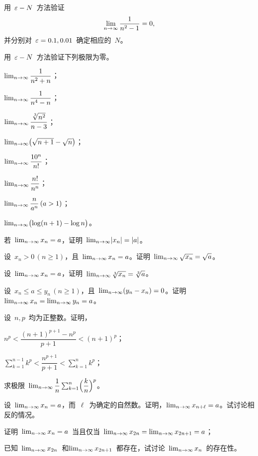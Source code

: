 \begin{exercise}
\item 用~$\e-N$~方法验证
\[
  \lim_\ntoinf\frac1{n^2-1}=0,
\]
并分别对~$\e=0.1,0.01$~确定相应的~$N$。
\item 用~$\e-N$~方法验证下列极限为零。
\begin{exlistcols}[3]
\item $\lim_\ntoinf\dfrac1{n^2+n}$；
\item $\lim_\ntoinf\dfrac1{n^4-n}$；
\item $\lim_\ntoinf\dfrac{\sqrt[3]{n^2}}{n-3}$；
\item $\lim_\ntoinf\Parenb{\sqrt{n+1}-\sqrt n}$；
\item $\lim_\ntoinf\dfrac{10^n}{n!}$；
\item $\lim_\ntoinf\dfrac{n!}{n^n}$；
\item $\lim_\ntoinf\dfrac n{a^n}\,(a>1)$；
\item $\lim_\ntoinf\Parenb{\ln(n+1)-\ln n}$。
\end{exlistcols}
\item 若~$\lim_\ntoinf x_n=a$，证明~$\lim_\ntoinf\abs{x_n}=\abs a$。
\item 设~$x_n>0\,(n\geq 1)$，且~$\lim_\ntoinf x_n=a$。证明~$\lim_\ntoinf\sqrt{x_n}=\sqrt a$。
\item 设~$\lim_\ntoinf x_n=a$，证明~$\lim_\ntoinf\sqrt[3]{x_n}=\sqrt[3]a$。
\item 设~$x_n\leq a\leq y_n\,(n\geq 1)$，且~$\lim_\ntoinf(y_n-x_n)=0$。证明~$\lim_\ntoinf x_n=\lim_\ntoinf y_n=a$。
\item 设~$n,p$~均为正整数。证明，
\begin{exlistcols}[2]
\item $n^p<\dfrac{(n+1)^{p+1}-n^p}{p+1}<(n+1)^p$；
\item $\sum_{k=1}^{n-1}k^p<\dfrac{n^{p+1}}{p+1}<\sum_{k=1}^nk^p$；
\item 求极限~$\lim_\ntoinf\dfrac1n\sum_{k=1}^n\Paren[\Big]{\dfrac kn}^p$。
\end{exlistcols}
\item 设~$\lim_\ntoinf x_n=a$，而~$\ell$~为确定的自然数。证明，$\lim_\ntoinf x_{n+\ell}=a$。试讨论相反的情况。
\item\begin{exlist}
  \item 证明~$\lim_\ntoinf x_n=a$~当且仅当~$\lim_\ntoinf x_{2n}=\lim_\ntoinf x_{2n+1}=a$；
  \item 已知~$\lim_\ntoinf x_{2n}$~和$\lim_\ntoinf x_{2n+1}$~都存在，试讨论~$\lim_\ntoinf x_n$~的存在性。

\end{exlist}
\end{exercise}
